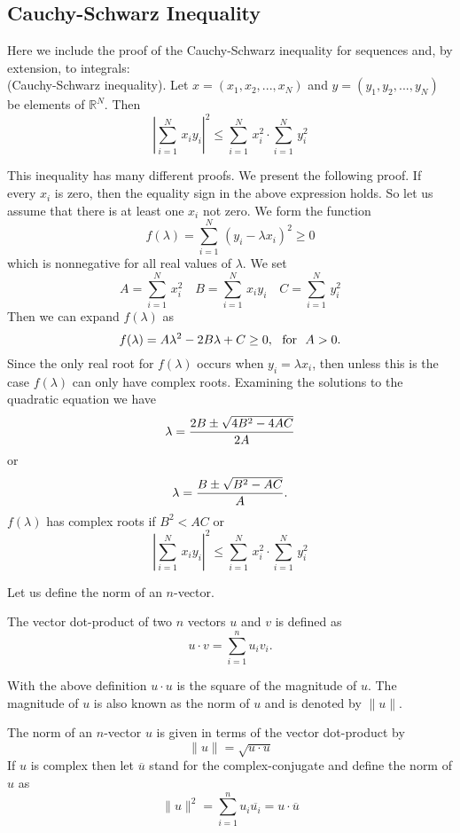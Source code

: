 \subsection{Cauchy-Schwarz Inequality}
\label{sec:CauchySchwarz}Here we include the proof of the Cauchy-Schwarz inequality for sequences and, by extension, to integrals:\\

(Cauchy-Schwarz inequality). Let $x=(x_1, x_2, ..., x_N)$ and $y = (y_1, y_2, ..., y_N)$ be elements of $\mathbb{R}^N$. Then 
$$ \left| \sum_{i=1}^N\, x_i y_i \right|^2 \le \sum_{i=1}^N\, x_i^2 \cdot \sum_{i=1}^N\, y_i^2$$

This inequality has many different proofs. We present the following proof. If every $x_i$ is zero, then the equality sign in the above expression holds. So let us assume that there is at least one $x_i$ not zero. We form the function $$f(\lambda) = \sum_{i=1}^N\, (y_i - \lambda x_i)^2 \ge 0$$ which is nonnegative for all real values of $\lambda$. We set 
$$A = \sum_{i=1}^N\, x_i^2 \quad  B = \sum_{i=1}^N\, x_i y_i \quad C = \sum_{i=1}^N\, y_i^2$$ Then we can expand $f(\lambda)$ as
$$f(\lambda) = A\lambda^2 - 2B\lambda + C \ge 0,~~ \hbox{for} ~~ A>0.$$ Since the only real root for $f(\lambda)$ occurs when $y_i = \lambda x_i$, then unless this is the case $f(\lambda)$ can only have complex roots. Examining the solutions to the quadratic equation we have $$\lambda = {2B \pm \sqrt{4B^2 - 4AC} \over 2A}$$ or $$\lambda = {B \pm \sqrt{B^2 - AC} \over A}.$$ $f(\lambda)$ has complex roots if $B^2 < AC$ or 
$$ \left| \sum_{i=1}^N\, x_i y_i \right|^2 \le \sum_{i=1}^N\, x_i^2 \cdot \sum_{i=1}^N\, y_i^2$$

Let us define the norm of an $n$-vector.
\begin{definition}
The vector dot-product of two $n$ vectors $u$ and $v$ is defined as 
$$u\cdot v = \sum_{i=1}^n u_i v_i.$$ 
\end{definition}

With the above definition $u\cdot u$ is the square of the magnitude of $u$. The magnitude of $u$ is also known as the norm of $u$ and is denoted by $\| u \|$.

\begin{definition}
The norm of an $n$-vector $u$ is given in terms of the vector dot-product by 
$$\| u \| = \sqrt{u \cdot u} $$
If $u$ is complex then let $\overline{u}$ stand for the complex-conjugate and define the norm of $u$ as
$$\| u \|^2 = \sum_{i=1}^n u_i \overline{u_i} = u \cdot \overline{u} $$
\end{definition}

